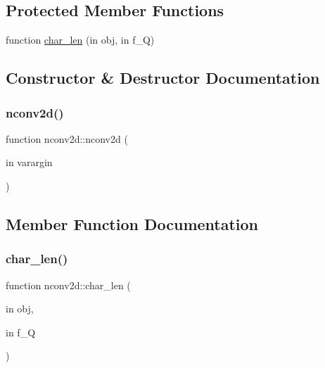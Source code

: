 \subsection*{Protected Member Functions}
\begin{DoxyCompactItemize}
\item 
function \hyperlink{classnconv2d_a7f091d7dda278ec22dab0d0c76050f53}{char\+\_\+len} (in obj, in f\+\_\+Q)
\end{DoxyCompactItemize}


\subsection{Constructor \& Destructor Documentation}
\mbox{\label{classnconv2d_a86615b1be9cadbaa37a736ab2d671a3d}} 
\subsubsection{\texorpdfstring{nconv2d()}{nconv2d()}}
{\footnotesize\ttfamily function nconv2d\+::nconv2d (\begin{DoxyParamCaption}\item[{in}]{varargin }\end{DoxyParamCaption})}



\subsection{Member Function Documentation}
\mbox{\label{classnconv2d_a7f091d7dda278ec22dab0d0c76050f53}} 
\subsubsection{\texorpdfstring{char\+\_\+len()}{char\_len()}}
{\footnotesize\ttfamily function nconv2d\+::char\+\_\+len (\begin{DoxyParamCaption}\item[{in}]{obj,  }\item[{in}]{f\+\_\+Q }\end{DoxyParamCaption})\hspace{0.3cm}{\ttfamily [protected]}}

\mbox{\label{classnconv2d_a7f4737ebd84781291d3250c0b909691a}} 
